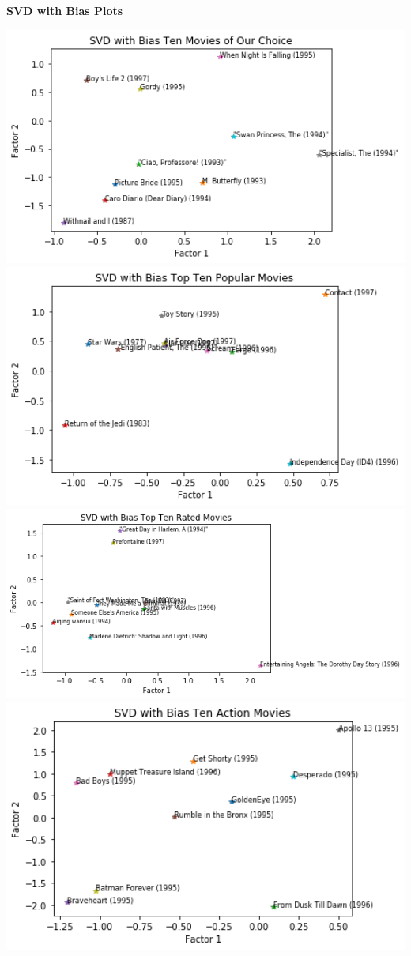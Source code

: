 \newpage
\noindent\textbf{SVD with Bias Plots }\\
\begin{center}
	\includegraphics[width=16cm]{Pictures/Bias_choice}
	\includegraphics[width=16cm]{Pictures/Bias_popular}
	\includegraphics[width=19cm]{Pictures/Bias_highest}
	\includegraphics[width=16cm]{Pictures/Bias_action}

\end{center}
